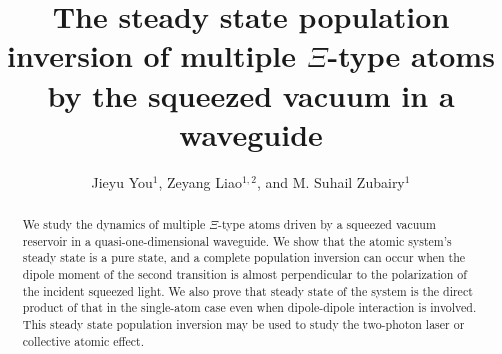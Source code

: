 \documentclass[aps,showpacs,twocolumn,twoside,groupedaddress]{revtex4}
\begin{document}
\title{The steady state population inversion of multiple $\Xi$-type atoms by the squeezed vacuum in a waveguide}
\author{Jieyu You$^{1}$, Zeyang Liao$^{1,2}$, and M. Suhail Zubairy$^{1}$}

\begin{abstract}
We study the dynamics of multiple $\Xi$-type atoms driven by a squeezed vacuum reservoir in a quasi-one-dimensional waveguide. We show that the atomic system's steady state is a pure state, and a complete population inversion can occur when the dipole moment of the second transition is almost perpendicular to the polarization of the incident squeezed light. We also prove that steady state of the system is the direct product of that in the single-atom case even when dipole-dipole interaction is involved. This steady state population inversion may be used to study the two-photon laser or collective atomic effect.
\end{abstract}
\maketitle 
\end{document}

